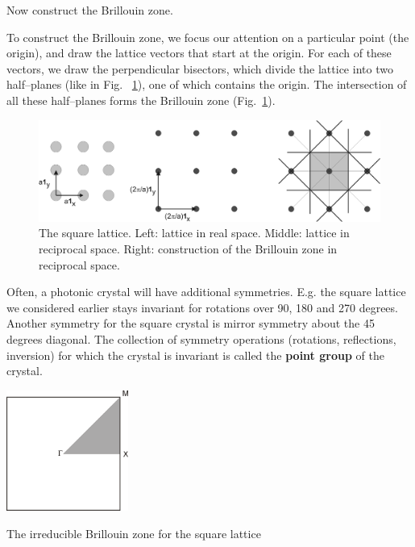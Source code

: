 \begin{cue}
Now construct the Brillouin zone.
\end{cue}

To construct the Brillouin zone, we focus our attention on a particular point (the origin), and draw the lattice vectors that start at the origin. For each of these vectors, we draw the perpendicular bisectors, which divide the lattice into two half--planes (like in Fig.~ \ref{fig-bril-square}), one of which contains the origin. The intersection of all these half--planes forms the Brillouin zone (Fig.~\ref{fig-bril-square}).

\begin{figure}
\centering
\includegraphics{symmetry/figures/brillouin_square}
\caption{The square lattice. Left: lattice in real space. Middle: lattice in reciprocal space. Right: construction of the Brillouin zone in reciprocal space.}
\label{fig-bril-square}
\end{figure}

\pagebreak
 

Often, a photonic crystal will have additional symmetries. E.g. the square lattice we considered earlier stays invariant for rotations over 90, 180 and 270 degrees. Another symmetry for the square crystal is mirror symmetry about the 45 degrees diagonal. The collection of symmetry operations (rotations, reflections, inversion) for which the crystal is invariant is called the \textbf{point group} of the crystal.

\begin{marginfigure}
\centering
\includegraphics[width=4cm]{symmetry/figures/irred_bril}
\caption{The irreducible Brillouin zone for the square lattice}
\label{fig-irred-bril}
\end{marginfigure}

